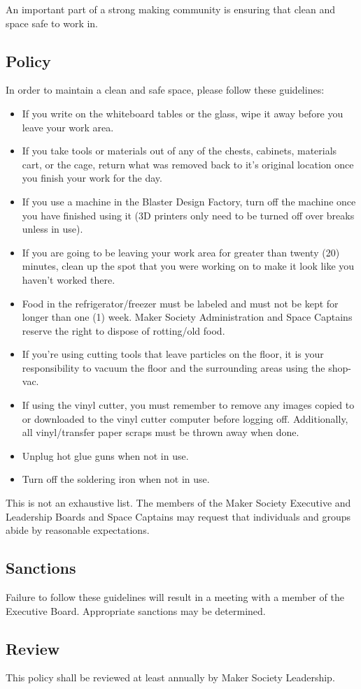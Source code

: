 \documentclass[12pt,letterpaper]{article}
\begin{document}
An important part of a strong making community is ensuring that clean and space safe to work in.

\subsection{Policy}

In order to maintain a clean and safe space, please follow these guidelines:
\begin{itemize}
    \item If you write on the whiteboard tables or the glass, wipe it away before you leave your work area.
    \item If you take tools or materials out of any of the chests, cabinets, materials cart, or the cage, return what was removed back to it’s original location once you finish your work for the day.
    \item If you use a machine in the Blaster Design Factory, turn off the machine once you have finished using it (3D printers only need to be turned off over breaks unless in use).
    \item If you are going to be leaving your work area for greater than twenty (20) minutes, clean up the spot that you were working on to make it look like you haven’t worked there. 
    \item Food in the refrigerator/freezer must be labeled and must not be kept for longer than one (1) week. Maker Society Administration and Space Captains reserve the right to dispose of rotting/old food.
    \item If you’re using cutting tools that leave particles on the floor, it is your responsibility to vacuum the floor and the surrounding areas using the shop-vac.
    \item If using the vinyl cutter, you must remember to remove any images copied to or downloaded to the vinyl cutter computer before logging off. Additionally, all vinyl/transfer paper scraps must be thrown away when done.
    \item Unplug hot glue guns when not in use.
    \item Turn off the soldering iron when not in use.
\end{itemize}

This is not an exhaustive list. The members of the Maker Society Executive and Leadership Boards and Space Captains may request that individuals and groups abide by reasonable expectations.


\subsection{Sanctions}

Failure to follow these guidelines will result in a meeting with a member of the Executive Board. Appropriate sanctions may be determined.

\subsection{Review}

This policy shall be reviewed at least annually by Maker Society Leadership.








    
\end{document}
